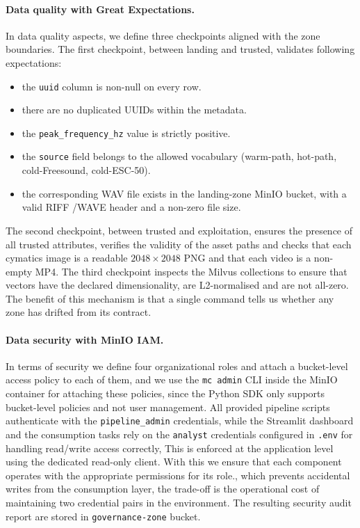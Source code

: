 \documentclass[11pt,a4paper]{article}
\begin{document}
\paragraph{Data quality with Great Expectations.}
In data quality aspects, we define three checkpoints aligned with the zone boundaries. The first checkpoint, between landing and trusted, validates following expectations:
\begin{itemize}
    \item the \texttt{uuid} column is non-null on every row.
    \item there are no duplicated UUIDs within the metadata.
    \item the \texttt{peak\_frequency\_hz} value is strictly positive.
    \item the \texttt{source} field belongs to the allowed vocabulary (warm-path, hot-path, cold-Freesound, cold-ESC-50).
    \item the corresponding WAV file exists in the landing-zone MinIO bucket, with a valid RIFF /WAVE header and a non-zero file size.
\end{itemize}
The second checkpoint, between trusted and exploitation, ensures the presence of all trusted attributes, verifies the validity of the asset paths and checks that each cymatics image is a readable $2048\times2048$ PNG and that each video is a non-empty MP4.
The third checkpoint inspects the Milvus collections to ensure that vectors have the declared dimensionality, are L2-normalised and are not all-zero. The benefit of this mechanism is that a single command tells us whether any zone has drifted from its contract.

\newpage

\paragraph{Data security with MinIO IAM.}
In terms of security we define four organizational roles and attach a bucket-level access policy to each of them, and we use the \texttt{mc admin} CLI inside the MinIO container for attaching these policies, since the Python SDK only supports bucket-level policies and not user management. All provided pipeline scripts authenticate with the \texttt{pipeline\_admin} credentials, while the Streamlit dashboard and the consumption tasks rely on the \texttt{analyst} credentials configured in \texttt{.env} for handling read/write access correctly, This is enforced at the application level using the dedicated read-only client. With this we ensure that each component operates with the appropriate permissions for its role., which prevents accidental writes from the consumption layer, the trade-off is the operational cost of maintaining two credential pairs in the environment. The resulting security audit report are stored in \texttt{governance-zone} bucket.
\end{document}
